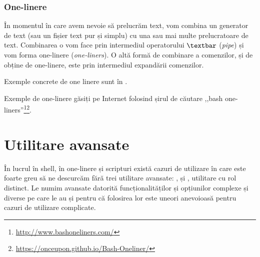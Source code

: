 \subsubsection{One-linere}
\label{sec:cli:basic-proc:proc:one-liners}

În momentul în care avem nevoie să prelucrăm text, vom combina un generator de
text (sau un fișier text pur și simplu) cu una sau mai multe prelucratoare de
text. Combinarea o vom face prin intermediul operatorului \texttt{$\textbar$} (\textit{pipe}) și vom
forma one-linere (\textit{one-liners}). O altă formă de combinare a comenzilor, și de obține de one-linere, este prin intermediul expandării comenzilor.

Exemple concrete de one linere sunt în .


Exemple de one-linere găsiți pe Internet folosind șirul de căutare ,,bash one-liners''\footnote{\url{http://www.bashoneliners.com/}}\footnote{\url{https://onceupon.github.io/Bash-Oneliner/}}.

\section{Utilitare avansate}
\label{sec:cli:advanced}

În lucrul în shell, în one-linere și scripturi există cazuri de utilizare în
care este foarte greu să ne descurcăm fără trei utilitare avansate: ,  și
, utilitare cu rol distinct. Le numim avansate datorită funcționalităților și
opțiunilor complexe și diverse pe care le au și pentru că folosirea lor este
uneori anevoioasă pentru cazuri de utilizare complicate.

